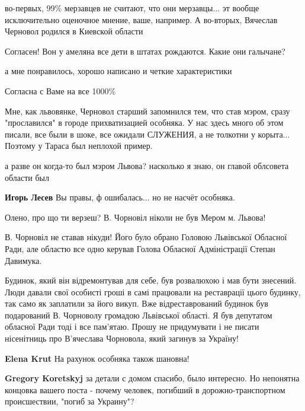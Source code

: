 \begin{itemize}
\begin{itemize}
во-первых, 99\% мерзавцев не считают, что они мерзавцы... эт вообще
исключительно оценочное мнение, ваше, например. А во-вторых, Вячеслав Черновол
родился в Киевской области

Согласен! Вон у амеляна все дети в штатах рождаются. Какие они галычане?
\end{itemize} %

а мне понравилось, хорошо написано и четкие характеристики

Согласна с Ваме на все 1000\%


Мне, как львовянке, Черновол старший запомнился тем, что став
мэром, сразу "прославился" в городе прихватизацией особняка. У нас здесь много об
этом писали, все были в шоке, все ожидали СЛУЖЕНИЯ, а не толкотни у
корыта... Поэтому у Тараса был неплохой пример.

\begin{itemize} %
а разве он когда-то был мэром Львова? насколько я знаю, он главой облсовета области был

\textbf{Игорь Лесев} Вы правы, ф ошибалась... но не насчёт особняка.


Олено, про що ти верзеш? В. Чорновіл ніколи не був Мером м. Львова!

В. Чорновіл не ставав нікуди! Його було обрано Головою Львівської Обласної
Ради, але областю все одно керував Голова Обласної Адміністрації Степан
Давимука.

Будинок, який він відремонтував для себе, був розвалюхою і мав бути знесений.
Люди давали свої особисті гроші в самі працювали на реставрації цього будинку,
так само як заплатили за його викуп. Вже відреставрований будинок був
подарований В. Чорноволу громадою Львівської області. Я був депутатом обласної
Ради тоді і все пам'ятаю. Прошу не придумувати і не писати нісенітниць про
В'ячеслава Чорновола, який загинув за Україну!

\textbf{Elena Krut} На рахунок особняка також шановна!

\textbf{Gregory Koretskyj} за детали с домом спасибо, было интересно. Но непонятна концовка вашего поста - почему человек, погибший в дорожно-транспортном происшествии, "погиб за Украину"?

\end{itemize} %


\end{itemize}
